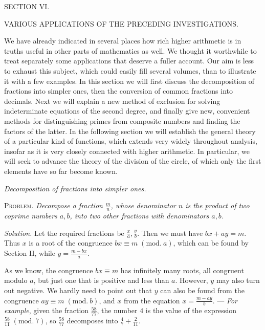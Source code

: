 \clearpage{}
\begin{center}\Large SECTION VI.\par\medskip\normalsize VARIOUS APPLICATIONS OF THE PRECEDING INVESTIGATIONS.\end{center}

We have already indicated in several places how rich higher arithmetic is in truths useful in other parts of mathematics as well. We thought it worthwhile to treat separately some applications that deserve a fuller account. Our aim is less to exhaust this subject, which could easily fill several volumes, than to illustrate it with a few examples. In this section we will first discuss the decomposition of fractions into simpler ones, then the conversion of common fractions into decimals. Next we will explain a new method of exclusion for solving indeterminate equations of the second degree, and finally give new, convenient methods for distinguishing primes from composite numbers and finding the factors of the latter. In the following section we will establish the general theory of a particular kind of functions, which extends very widely throughout analysis, insofar as it is very closely connected with higher arithmetic. In particular, we will seek to advance the theory of the division of the circle, of which only the first elements have so far become known.

\begin{center}\textit{Decomposition of fractions into simpler ones.}\end{center}

\textsc{Problem.} \textit{Decompose a fraction \(\frac mn\), whose denominator \(n\) is the product of two coprime numbers \(a,b\), into two other fractions with denominators \(a,b\).}

\textit{Solution.} Let the required fractions be \(\frac xa,\frac yb\). Then we must have \(bx+ay=m\). Thus \(x\) is a root of the congruence \(bx\equiv m\; (\mathrm{mod}.\ a)\), which can be found by Section II, while \(y\)\(=\frac{m-bx}{a}\).

As we know, the congruence \(bx\equiv m\) has infinitely many roots, all congruent modulo \(a\), but just one that is positive and less than \(a\). However, \(y\) may also turn out negative. We hardly need to point out that \(y\) can also be found from the congruence \(ay\equiv m\; (\mathrm{mod}.\ b)\), and \(x\) from the equation \(x=\frac{m-ay}{b}\). — \textit{For example}, given the fraction \(\frac{58}{77}\), the number \(4\) is the value of the expression \(\frac{58}{11}\; (\mathrm{mod}.\ 7)\), so \(\frac{58}{77}\) decomposes into \(\frac47+\frac2{11}\).

